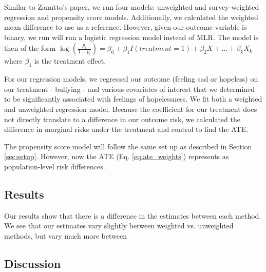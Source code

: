\documentclass[12pt]{article}
\begin{document}
Similar to Zanutto's paper, we run four models: unweighted and survey-weighted regression and propensity score models. Additionally, we calculated the weighted mean difference to use as a reference. However, given our outcome variable is binary, we run will run a logistic regression model instead of MLR. The model is then of the form $\log(\frac{p_i}{1-p_i}) = \beta_0 + \beta_1I(treatment = 1) + \beta_2X + ... + \beta_kX_k$ where $\beta_1$ is the treatment effect. 

For our regression models, we regressed our outcome (feeling sad or hopeless) on our treatment - bullying - and various covariates of interest that we determined to be significantly associated with feelings of hopelessness. We fit both a weighted and unweighted regression model. Because the coefficient for our treatment does not directly translate to a difference in our outcome risk, we calculated the difference in marginal risks under the treatment and control to find the ATE.

The propensity score model will follow the same set up as described in Section \ref{sec:setup}. However, now the ATE (Eq. \ref{eq:ate_weights}) represents as population-level risk differences.

\subsection{Results}

Our results show that there is a difference in the estimates between each method. We see that our estimates vary slightly between weighted vs. unweighted methods, but vary much more between 



\subsection{Discussion}




\end{document}
